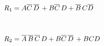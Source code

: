 \begin{minipage}{0.45\textwidth}
	\begin{flushleft} \Large{$R_1 = A\overline{C}\,\overline{D}\,+B\overline{C}\,D+\overline{B}\,C\overline{D}\,$}\\
	    \large
		\begin{Karnaugh}
        \end{Karnaugh}
	\end{flushleft}
\end{minipage}
~
\begin{minipage}{0.45\textwidth}
	\begin{flushright} \Large{$R_2 = \overline{A}\,\overline{B}\,\overline{C}\,D+B\overline{C}\,\overline{D}\,+BCD$}\\
	    \large
        \begin{Karnaugh}
        \end{Karnaugh}
	\end{flushright}
\end{minipage}\\[2cm]